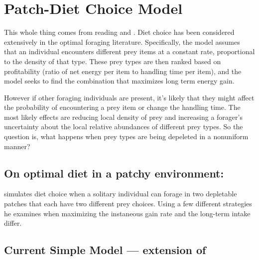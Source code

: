 \documentclass{article}\usepackage{graphicx, color}
\begin{document}
\tableofcontents
\section{Patch-Diet Choice Model}


This whole thing comes from reading \citep{GiraldeauCaraco:2000} and  \citep{Heller:1980}. Diet choice has been considered extensively in the optimal foraging literature. Specifically, the model assumes that an individual encounters different prey items at a constant rate, proportional to the density of that type. These prey types are then ranked based on profitability (ratio of net energy per item to handling time per item), and the model seeks to find the combination that maximizes long term energy gain. 

However if other foraging individuals are present, it's likely that they might affect the probability of encountering a prey item or change the handling time. The most likely effects are reducing local density of prey and increasing a forager's uncertainty about the local relative abundances of different prey types. So the question is, what happens when prey types are being depeleted in a nonuniform manner? 

\subsection{On optimal diet in a patchy environment: \cite{Heller:1980}}

\cite{Heller:1980} simulates diet choice when a solitary individual can forage in two depletable patches that each have two different prey choices. Using a few different strategies he examines when maximizing the instaneous gain rate and the long-term intake differ. 


\subsection{Current Simple Model --- extension of \cite{abramsetal:2012}}
\end{document}
